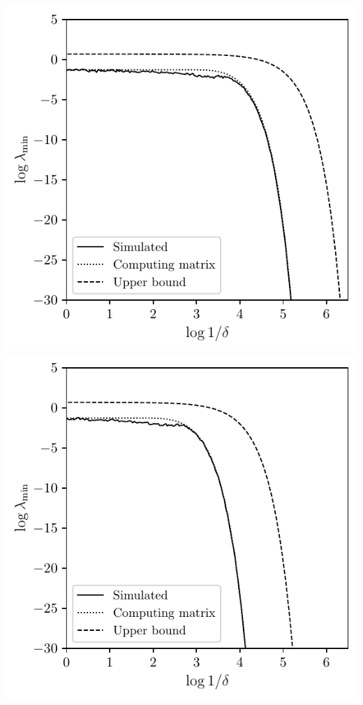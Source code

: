 \documentclass{article}
\begin{document}
\includegraphics[scale=0.5]{graphics/sim_1.pdf}
\includegraphics[scale=0.5]{graphics/sim_2.pdf}
\end{document}
